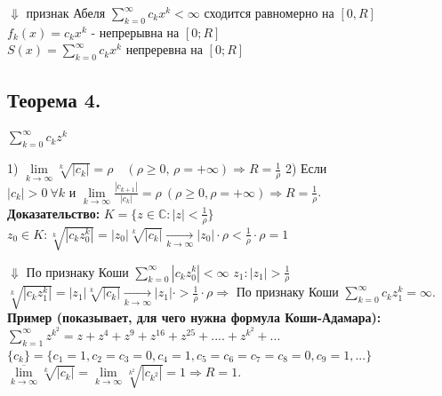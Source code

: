 \documentclass[a4paper,12pt]{article} %
\begin{document}
\hspace*{3 cm}$\Downarrow$ признак Абеля
$\sum\limits_{k = 0}^\infty c_k x^k < \infty$ сходится равномерно на $[0, R]$
$f_k(x) = c_k x^k$  - непрерывна на $[0; R]$\\
$S(x) = \sum\limits_{k = 0}^\infty c_k x^k$ непреревна на $[0; R]$
\subsection{Теорема 4.}
$\sum\limits_{k = 0}^\infty c_k z^k$ 

1) $\lim\limits_{k \to \infty} \sqrt[k]{|c_k|} = \rho \quad (\rho \geqslant 0,\, \rho = +\infty) \Rightarrow R =  \frac{1}{\rho}$
2) Если $|c_k| > 0 \  \forall k \text{ и } \lim\limits_{k \to \infty} \frac{|c_{k+1}|}{|c_k|} = \rho \ (\rho \geqslant 0, \rho = +\infty) \Rightarrow R = \frac{1}{\rho}$.\\
\textbf{Доказательство:}
$K = \{z \in \mathbb{C}: |z| < \frac{1}{\rho} \}$ \\
$z_0 \in K: \sqrt[k]{|c_k z_0^k|} = |z_0| \sqrt[k]{|c_k|} \underset{k \to \infty}{\longrightarrow} |z_0| \cdot \rho < \frac{1}{\rho} \cdot \rho = 1 $

\hspace*{3 cm} $\Downarrow$ По признаку Коши
\hspace*{3 cm}$\sum\limits_{k = 0}^\infty |c_k z_0^k| < \infty$
$z_1: |z_1| > \frac{1}{\rho}$
$\sqrt[k]{|c_k z_1^k|} = |z_1| \sqrt[k]{|c_k|} \underset{k \to \infty}{\longrightarrow} |z_1| \cdot > \frac{1}{\rho} \cdot \rho \Rightarrow
$ По признаку Коши $\sum\limits_{k = 0}^\infty c_k z_1^k = \infty$.\\
\textbf{Пример (показывает, для чего нужна формула Коши-Адамара):}\\
$\sum\limits_{k = 1}^\infty z^{k^2} = z + z^4 + z^9 + z^{16} + z^{25} + .... + z^{k^2} + ...
$
$ \{c_k\} = \{ c_1 = 1, c_2 = c_3 = 0, c_4 = 1, c_5 = c_6 = c_7 = c_8 = 0, c_9 = 1, ... \} $\\
$\overline{\lim\limits_{k \to \infty}} \sqrt[k]{|c_k|} = \lim\limits_{k \to \infty} \sqrt[k^2]{|c_{k^2}|} = 1 \Rightarrow R = 1$.\\ 
\end{document}
